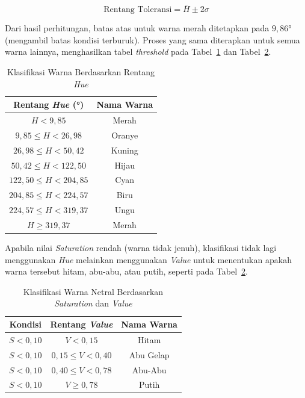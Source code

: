 \begin{equation}
  \text{Rentang Toleransi} = \bar{H} \pm 2\sigma
  \label{eq:tolerance}
\end{equation}

Dari hasil perhitungan, batas atas untuk warna merah ditetapkan pada $9{,}86°$ (mengambil batas kondisi terburuk).
Proses yang sama diterapkan untuk semua warna lainnya, menghasilkan tabel \textit{threshold} pada Tabel~\ref{tab:hue-threshold} dan Tabel~\ref{tab:grayscale-threshold}.

\begin{table}[H]
  \centering
  \caption{Klasifikasi Warna Berdasarkan Rentang \textit{Hue}}
  \label{tab:hue-threshold}
  \begin{tabular}{|c|c|}
    \hline
    Rentang \textit{Hue} (°) & Nama Warna \\
    \hline
    $H < 9{,}85$                       & Merah   \\
    $9{,}85  \leq H < 26{,}98$         & Oranye  \\
    $26{,}98 \leq H < 50{,}42$         & Kuning  \\
    $50{,}42 \leq H < 122{,}50$        & Hijau   \\
    $122{,}50 \leq H < 204{,}85$       & Cyan    \\
    $204{,}85 \leq H < 224{,}57$       & Biru    \\
    $224{,}57 \leq H < 319{,}37$       & Ungu    \\
    $H \geq 319{,}37$                  & Merah   \\
    \hline
  \end{tabular}
\end{table}

Apabila nilai \textit{Saturation} rendah (warna tidak jenuh), klasifikasi tidak lagi menggunakan \textit{Hue} melainkan menggunakan \textit{Value} untuk menentukan apakah warna tersebut hitam, abu-abu, atau putih, seperti pada Tabel~\ref{tab:grayscale-threshold}.

\begin{table}[H]
  \centering
  \caption{Klasifikasi Warna Netral Berdasarkan \textit{Saturation} dan \textit{Value}}
  \label{tab:grayscale-threshold}
  \begin{tabular}{|c|c|c|}
    \hline
    Kondisi  & Rentang \textit{Value} & Nama Warna \\
    \hline
    $S < 0{,}10$ & $V < 0{,}15$              & Hitam     \\
    $S < 0{,}10$ & $0{,}15 \leq V < 0{,}40$  & Abu Gelap \\
    $S < 0{,}10$ & $0{,}40 \leq V < 0{,}78$  & Abu-Abu   \\
    $S < 0{,}10$ & $V \geq 0{,}78$           & Putih     \\
    \hline
  \end{tabular}
\end{table}

